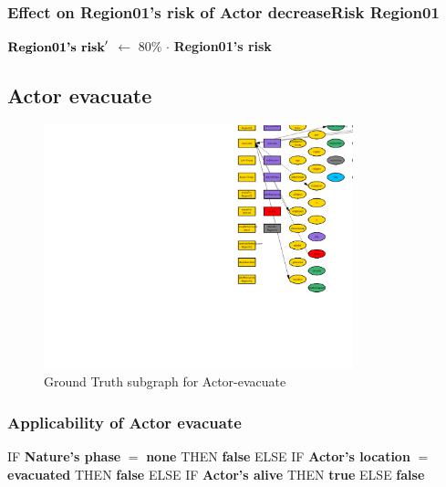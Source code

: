 \documentclass{article}%
\begin{document}
%
\subsubsection{Effect on Region01's risk of Actor decreaseRisk Region01}%
\label{ssubsec:Effect on Region01's risk of Actor decreaseRisk Region01}%
\begin{flushleft}%
$\mbox{\textbf{Region01's risk}} '$%
$\leftarrow$%
80\%%
$\cdot$%
\textbf{Region01's risk}%
\end{flushleft}

%
\subsection{Actor evacuate}%
\label{subsec:Actor evacuate}%


\begin{figure}[ht]%
\centering%
\includegraphics[width=0.8\textwidth]{images/Actor-evacuate.png}%
\caption{Ground Truth subgraph for Actor{-}evacuate}%
\end{figure}

%
\subsubsection{Applicability of Actor evacuate}%
\label{ssubsec:Applicability of Actor evacuate}%
\begin{flushleft}%
IF %
\textbf{Nature's phase}%
$=$%
\textbf{none}%
\linebreak%
\hspace*{2em}%
THEN %
\textbf{false}%
\linebreak%
\hspace*{2em}%
ELSE %
IF %
\textbf{Actor's location}%
$=$%
\textbf{evacuated}%
\linebreak%
\hspace*{4em}%
THEN %
\textbf{false}%
\linebreak%
\hspace*{4em}%
ELSE %
IF %
\textbf{Actor's alive}%
\linebreak%
\hspace*{6em}%
THEN %
\textbf{true}%
\linebreak%
\hspace*{6em}%
ELSE %
\textbf{false}%
\end{flushleft}
\end{document}
